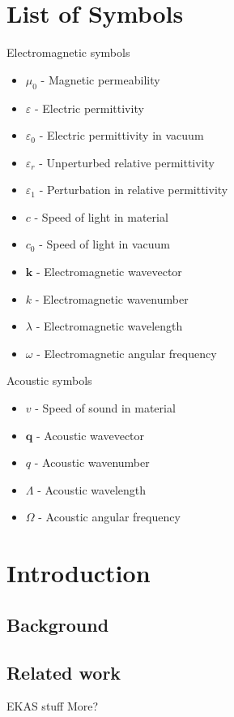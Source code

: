 \documentclass[10pt,a4paper]{eitExjobb}
\begin{document}
	\chapter*{List of Symbols}
	Electromagnetic symbols
	\begin{itemize}
		\item $\mu_0$ - Magnetic permeability
		\item $\varepsilon$ - Electric permittivity
		\item $\varepsilon_0$ - Electric permittivity in vacuum
		\item $\varepsilon_r$ - Unperturbed relative permittivity
		\item $\varepsilon_1$ - Perturbation in relative permittivity
		\item $c$ - Speed of light in material
		\item $c_0$ - Speed of light in vacuum
		\item $\bm{k}$ - Electromagnetic wavevector
		\item $k$ - Electromagnetic wavenumber
		\item $\lambda$ - Electromagnetic wavelength
		\item $\omega$ - Electromagnetic angular frequency
	\end{itemize}
	Acoustic symbols
	\begin{itemize}
		\item $v$ - Speed of sound in material
		\item $\bm{q}$ - Acoustic wavevector
		\item $q$ - Acoustic wavenumber
		\item $\Lambda$ - Acoustic wavelength
		\item $\Omega$ - Acoustic angular frequency
	\end{itemize}
	\cleardoublepage
	
	\mainmatter		%
	
	\chapter{Introduction \label{ch:intro}}
	
	\section{Background}
	
	\section{Related work}
	EKAS stuff
	More?
	
\end{document}
